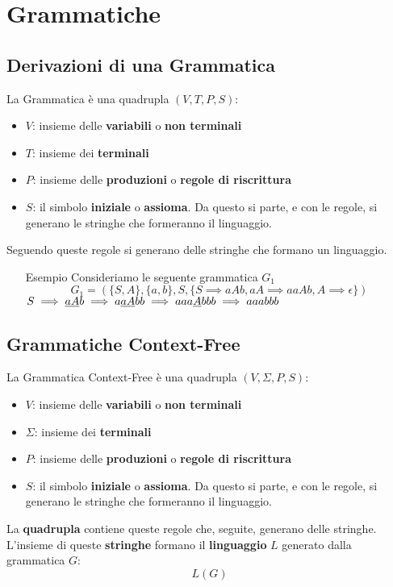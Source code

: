 \documentclass[14pt]{extarticle}
\begin{document}
\section{Grammatiche}
\subsection{Derivazioni di una Grammatica}
La Grammatica è una quadrupla $(V,T,P,S)$:
\begin{itemize}
    \item $V$: insieme delle \textbf{variabili} o \textbf{non terminali}
    \item $T$: insieme dei \textbf{terminali}
    \item $P$: insieme delle \textbf{produzioni} o \textbf{regole di riscrittura}
    \item $S$: il simbolo \textbf{iniziale} o \textbf{assioma}. Da questo si parte, e con le regole, si generano le stringhe che formeranno il linguaggio.
\end{itemize}
Seguendo queste regole si generano delle stringhe che formano un linguaggio.
\begin{itemize}
    \item[Esempio] Consideriamo le seguente grammatica $G_1$
    \begin{equation*}
        G_1=(\{S,A\},\{a,b\},S,\{S \implies aAb,aA \implies aaAb,A\implies \epsilon\})
    \end{equation*}
    \begin{math}
        S \implies \underline{aA}b\\
        \implies a\underline{aA}bb\\
        \implies aaa\underline{A}bbb\\
        \implies aaabbb
    \end{math}
\end{itemize}

\subsection{Grammatiche Context-Free}
La Grammatica Context-Free è una quadrupla $(V,\Sigma,P,S)$:
\begin{itemize}
    \item $V$: insieme delle \textbf{variabili} o \textbf{non terminali}
    \item $\Sigma$: insieme dei \textbf{terminali}
    \item $P$: insieme delle \textbf{produzioni} o \textbf{regole di riscrittura}
    \item $S$: il simbolo \textbf{iniziale} o \textbf{assioma}. Da questo si parte, e con le regole, si generano le stringhe che formeranno il linguaggio.
\end{itemize}
La \textbf{quadrupla} contiene queste regole che, seguite, generano delle stringhe.\\
L'insieme di queste \textbf{stringhe} formano il \textbf{linguaggio} $L$ generato dalla grammatica $G$:
\begin{equation*}
    L(G)
\end{equation*}
\end{document}

